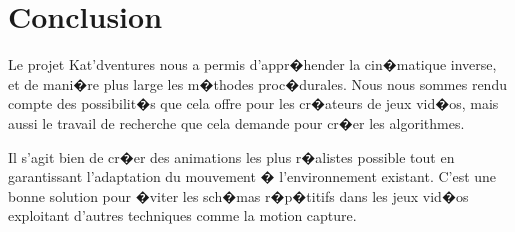 \documentclass[a4paper,11pt]{article}
\begin{document}
%	
%	
%	
%	
%	
%	
%	
%	


\section{Conclusion} 
 
Le projet Kat'dventures nous a permis d'appr�hender la cin�matique inverse, et de mani�re plus large les m�thodes proc�durales. Nous nous sommes rendu compte des possibilit�s que cela offre pour les cr�ateurs de jeux vid�os, mais aussi le travail de recherche que cela demande pour cr�er les algorithmes. 

Il s'agit bien de cr�er des animations les plus r�alistes possible tout en garantissant l'adaptation du mouvement � l'environnement existant. C'est une bonne solution pour �viter les sch�mas r�p�titifs dans les jeux vid�os exploitant d'autres techniques comme la motion capture. 


\end{document}
